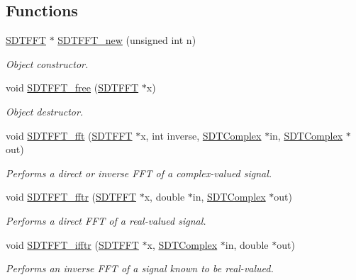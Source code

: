 \subsection*{Functions}
\begin{DoxyCompactItemize}
\item 
\hyperlink{group__fft_ga015ad058ec983e8f92811ba2ab637ab8}{S\+D\+T\+F\+F\+T} $\ast$ \hyperlink{group__fft_ga7451c1112b79820b9c7cfa39aa502869}{S\+D\+T\+F\+F\+T\+\_\+new} (unsigned int n)
\begin{DoxyCompactList}\small\item\em Object constructor. \end{DoxyCompactList}\item 
void \hyperlink{group__fft_ga232ab38b8aaf2ca31d16756c62c77e7b}{S\+D\+T\+F\+F\+T\+\_\+free} (\hyperlink{group__fft_ga015ad058ec983e8f92811ba2ab637ab8}{S\+D\+T\+F\+F\+T} $\ast$x)
\begin{DoxyCompactList}\small\item\em Object destructor. \end{DoxyCompactList}\item 
void \hyperlink{group__fft_ga0ff30a0fbadf6d0a75d87dee3eb47a99}{S\+D\+T\+F\+F\+T\+\_\+fft} (\hyperlink{group__fft_ga015ad058ec983e8f92811ba2ab637ab8}{S\+D\+T\+F\+F\+T} $\ast$x, int inverse, \hyperlink{struct_s_d_t_complex}{S\+D\+T\+Complex} $\ast$in, \hyperlink{struct_s_d_t_complex}{S\+D\+T\+Complex} $\ast$out)
\begin{DoxyCompactList}\small\item\em Performs a direct or inverse F\+F\+T of a complex-\/valued signal. \end{DoxyCompactList}\item 
void \hyperlink{group__fft_gaf4cbb91317ebe5652582ba3761941d1b}{S\+D\+T\+F\+F\+T\+\_\+fftr} (\hyperlink{group__fft_ga015ad058ec983e8f92811ba2ab637ab8}{S\+D\+T\+F\+F\+T} $\ast$x, double $\ast$in, \hyperlink{struct_s_d_t_complex}{S\+D\+T\+Complex} $\ast$out)
\begin{DoxyCompactList}\small\item\em Performs a direct F\+F\+T of a real-\/valued signal. \end{DoxyCompactList}\item 
void \hyperlink{group__fft_ga1939d8a2eaa608ffd066dff554d9ae6e}{S\+D\+T\+F\+F\+T\+\_\+ifftr} (\hyperlink{group__fft_ga015ad058ec983e8f92811ba2ab637ab8}{S\+D\+T\+F\+F\+T} $\ast$x, \hyperlink{struct_s_d_t_complex}{S\+D\+T\+Complex} $\ast$in, double $\ast$out)
\begin{DoxyCompactList}\small\item\em Performs an inverse F\+F\+T of a signal known to be real-\/valued. \end{DoxyCompactList}\end{DoxyCompactItemize}


